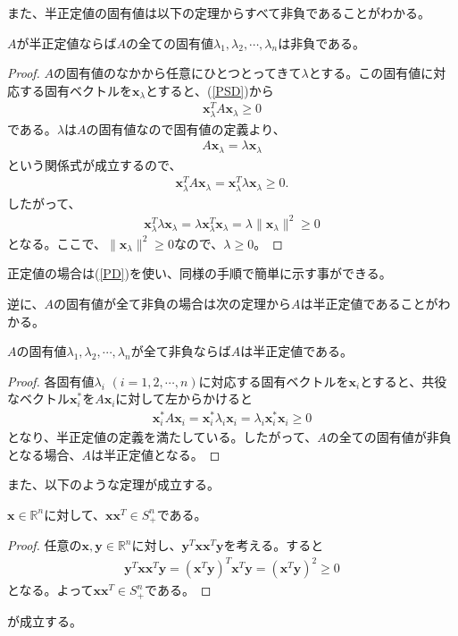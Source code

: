 また、半正定値の固有値は以下の定理からすべて非負であることがわかる。
\begin{theorem}
  $A$が半正定値ならば$A$の全ての固有値$\lambda_1, \lambda_2, \cdots, \lambda_n$は非負である。
\end{theorem}
\begin{proof}
  $A$の固有値のなかから任意にひとつとってきて$\lambda$とする。この固有値に対応する固有ベクトルを$\mathbf{x}_\lambda$とすると、(\ref{PSD})から
  \begin{align*}
    \mathbf{x}_\lambda^T A \mathbf{x}_\lambda \geq 0
  \end{align*}
  である。$\lambda$は$A$の固有値なので固有値の定義より、
  \begin{align*}
    A \mathbf{x}_\lambda = \lambda \mathbf{x}_\lambda
  \end{align*}
  という関係式が成立するので、
  \begin{align*}
    \mathbf{x}_\lambda^T A \mathbf{x}_\lambda = \mathbf{x}_\lambda^T \lambda \mathbf{x}_\lambda \geq 0.
  \end{align*}
  したがって、
  \begin{align*}
    \mathbf{x}_\lambda^T \lambda \mathbf{x}_\lambda = \lambda \mathbf{x}_\lambda^T \mathbf{x}_\lambda = \lambda \|\mathbf{x}_\lambda\|^2 \geq 0
  \end{align*}
  となる。ここで、$\|\mathbf{x}_\lambda\|^2 \geq 0$なので、$\lambda \geq 0$。
\end{proof}
正定値の場合は(\ref{PD})を使い、同様の手順で簡単に示す事ができる。

逆に、$A$の固有値が全て非負の場合は次の定理から$A$は半正定値であることがわかる。
\begin{theorem}
  $A$の固有値$\lambda_1, \lambda_2, \cdots, \lambda_n$が全て非負ならば$A$は半正定値である。
\end{theorem}
\begin{proof}
  各固有値$\lambda_i \,\, (i = 1, 2, \cdots, n)$に対応する固有ベクトルを$\mathbf{x}_i$とすると、共役なベクトル$\mathbf{x}_i^*$を$A \mathbf{x}_i$に対して左からかけると
  \begin{align*}
    \mathbf{x}_i^* A \mathbf{x}_i = \mathbf{x}_i^* \lambda_i \mathbf{x}_i = \lambda_i \mathbf{x}_i^* \mathbf{x}_i \geq 0
  \end{align*}
  となり、半正定値の定義を満たしている。したがって、$A$の全ての固有値が非負となる場合、$A$は半正定値となる。
\end{proof}

また、以下のような定理が成立する。
\begin{theorem} \label{PsdMatrix}
  $\mathbf{x} \in \mathbb{R}^n$に対して、$\mathbf{x} \mathbf{x}^T \in S_+^n$である。
\end{theorem}
\begin{proof}
  任意の$\mathbf{x}, \mathbf{y} \in \mathbb{R}^n$に対し、$\mathbf{y}^T \mathbf{x} \mathbf{x}^T \mathbf{y}$を考える。すると
  \begin{align*}
    \mathbf{y}^T \mathbf{x} \mathbf{x}^T \mathbf{y} = \left(\mathbf{x}^T \mathbf{y}\right)^T \mathbf{x}^T \mathbf{y} = \left(\mathbf{x}^T \mathbf{y}\right)^2 \geq 0
  \end{align*}
  となる。よって$\mathbf{x} \mathbf{x}^T \in S_+^n$である。
\end{proof}
が成立する。

